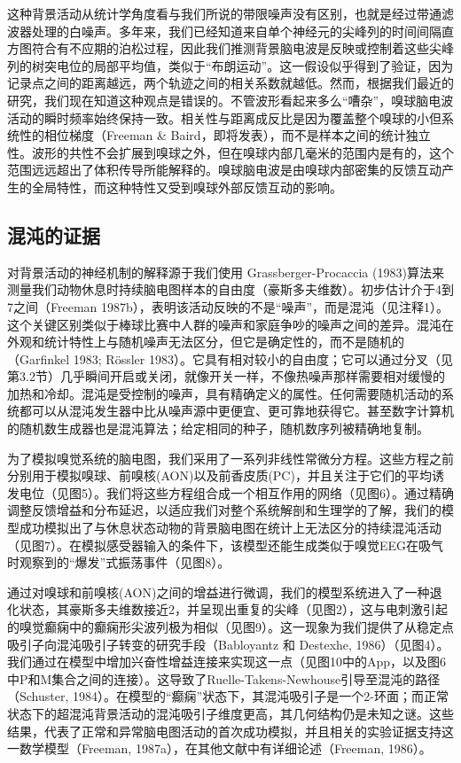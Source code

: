 \documentclass[a4paper,12pt]{article}
\begin{document}
这种背景活动从统计学角度看与我们所说的带限噪声没有区别，也就是经过带通滤波器处理的白噪声。多年来，我们已经知道来自单个神经元的尖峰列的时间间隔直方图符合有不应期的泊松过程，因此我们推测背景脑电波是反映或控制着这些尖峰列的树突电位的局部平均值，类似于“布朗运动”。这一假设似乎得到了验证，因为记录点之间的距离越远，两个轨迹之间的相关系数就越低。然而，根据我们最近的研究，我们现在知道这种观点是错误的。不管波形看起来多么“嘈杂”，嗅球脑电波活动的瞬时频率始终保持一致。相关性与距离成反比是因为覆盖整个嗅球的小但系统性的相位梯度（Freeman \& Baird，即将发表），而不是样本之间的统计独立性。波形的共性不会扩展到嗅球之外，但在嗅球内部几毫米的范围内是有的，这个范围远远超出了体积传导所能解释的。嗅球脑电波是由嗅球内部密集的反馈互动产生的全局特性，而这种特性又受到嗅球外部反馈互动的影响。

\subsection{混沌的证据}

对背景活动的神经机制的解释源于我们使用 Grassberger-Procaccia (1983)算法来测量我们动物休息时持续脑电图样本的自由度（豪斯多夫维数）。初步估计介于4到7之间（Freeman 1987b），表明该活动反映的不是“噪声”，而是混沌（见注释1）。这个关键区别类似于棒球比赛中人群的噪声和家庭争吵的噪声之间的差异。混沌在外观和统计特性上与随机噪声无法区分，但它是确定性的，而不是随机的（Garfinkel 1983; Rössler 1983）。它具有相对较小的自由度；它可以通过分叉（见第3.2节）几乎瞬间开启或关闭，就像开关一样，不像热噪声那样需要相对缓慢的加热和冷却。混沌是受控制的噪声，具有精确定义的属性。任何需要随机活动的系统都可以从混沌发生器中比从噪声源中更便宜、更可靠地获得它。甚至数字计算机的随机数生成器也是混沌算法；给定相同的种子，随机数序列被精确地复制。

为了模拟嗅觉系统的脑电图，我们采用了一系列非线性常微分方程。这些方程之前分别用于模拟嗅球、前嗅核(AON)以及前香皮质(PC)，并且关注于它们的平均诱发电位（见图5）。我们将这些方程组合成一个相互作用的网络（见图6）。通过精确调整反馈增益和分布延迟，以适应我们对整个系统解剖和生理学的了解，我们的模型成功模拟出了与休息状态动物的背景脑电图在统计上无法区分的持续混沌活动（见图7）。在模拟感受器输入的条件下，该模型还能生成类似于嗅觉EEG在吸气时观察到的“爆发”式振荡事件（见图8）。

通过对嗅球和前嗅核(AON)之间的增益进行微调，我们的模型系统进入了一种退化状态，其豪斯多夫维数接近2，并呈现出重复的尖峰（见图2），这与电刺激引起的嗅觉癫痫中的癫痫形尖波列极为相似（见图9）。这一现象为我们提供了从稳定点吸引子向混沌吸引子转变的研究手段（Babloyantz 和 Destexhe, 1986）（见图4）。我们通过在模型中增加兴奋性增益连接来实现这一点（见图10中的App，以及图6中P和M集合之间的连接）。这导致了Ruelle-Takens-Newhouse引导至混沌的路径（Schuster, 1984）。在模型的“癫痫”状态下，其混沌吸引子是一个2-环面；而正常状态下的超混沌背景活动的混沌吸引子维度更高，其几何结构仍是未知之谜。这些结果，代表了正常和异常脑电图活动的首次成功模拟，并且相关的实验证据支持这一数学模型（Freeman, 1987a），在其他文献中有详细论述（Freeman, 1986）。
\end{document}
